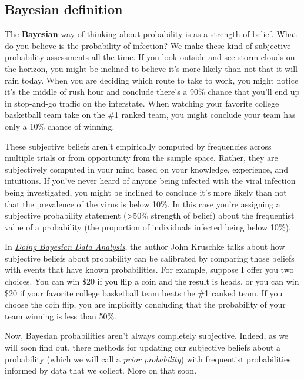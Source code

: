 \documentclass[
]{book}
\begin{document}
\subsection{Bayesian definition}\label{bayesian-definition}

The \textbf{Bayesian} way of thinking about probability is as a strength of belief. What do you believe is the probability of infection? We make these kind of subjective probability assessments all the time. If you look outside and see storm clouds on the horizon, you might be inclined to believe it's more likely than not that it will rain today. When you are deciding which route to take to work, you might notice it's the middle of rush hour and conclude there's a 90\% chance that you'll end up in stop-and-go traffic on the interstate. When watching your favorite college basketball team take on the \#1 ranked team, you might conclude your team has only a 10\% chance of winning.

These subjective beliefs aren't empirically computed by frequencies across multiple trials or from opportunity from the sample space. Rather, they are subjectively computed in your mind based on your knowledge, experience, and intuitions. If you've never heard of anyone being infected with the viral infection being investigated, you might be inclined to conclude it's more likely than not that the prevalence of the virus is below 10\%. In this case you're assigning a subjective probability statement (\textgreater50\% strength of belief) about the frequentist value of a probability (the proportion of individuals infected being below 10\%).

In \href{https://sites.google.com/site/doingbayesiandataanalysis/}{\emph{Doing Bayesian Data Analysis}}, the author John Kruschke talks about how subjective beliefs about probability can be calibrated by comparing those beliefs with events that have known probabilities. For example, suppose I offer you two choices. You can win \$20 if you flip a coin and the result is heads, or you can win \$20 if your favorite college basketball team beats the \#1 ranked team. If you choose the coin flip, you are implicitly concluding that the probability of your team winning is less than 50\%.

Now, Bayesian probabilities aren't always completely subjective. Indeed, as we will soon find out, there methods for updating our subjective beliefs about a probability (which we will call a \emph{prior probability}) with frequentist probabilities informed by data that we collect. More on that soon.
\end{document}

